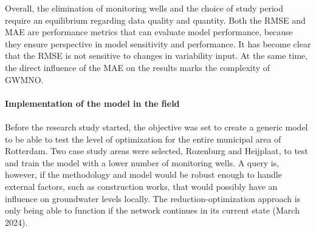 \newline
Overall, the elimination of monitoring wells and the choice of study period require an equilibrium regarding data quality and quantity.  Both the RMSE and MAE are performance metrics that can evaluate model performance, because they ensure perspective in model sensitivity and performance. It has become clear that the RMSE is not sensitive to changes in variability input. At the same time, the direct influence of the MAE on the results marks the complexity of GWMNO. \\
\\
\textbf{Implementation of the model in the field}\\
\\
Before the research study started, the objective was set to create a generic model to be able to test the level of optimization for the entire municipal area of Rotterdam. Two case study areas were selected, Rozenburg and Heijplaat, to test and train the model with a lower number of monitoring wells. A query is, however, if the methodology and model would be robust enough to handle external factors, such as construction works, that would possibly have an influence on groundwater levels locally. The reduction-optimization approach is only being able to function if the network continues in its current state (March 2024).


